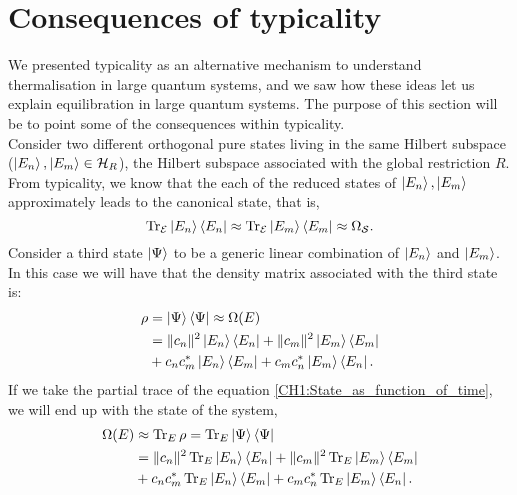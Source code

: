 \section{Consequences of typicality}
We presented typicality as an alternative mechanism to understand thermalisation in large quantum systems, and we saw how these ideas let us explain equilibration in large quantum systems. The purpose of this section will be to point some of the consequences within typicality.\\
\indent Consider two different orthogonal pure states living in the same Hilbert subspace ($\mathinner{|{E_n}\rangle},\mathinner{|{E_m}\rangle} \in \mathcal{H}_{R}$), the Hilbert subspace associated with the global restriction $R$. From typicality, we know that the each of the reduced states of $\mathinner{|{E_n}\rangle},\mathinner{|{E_m}\rangle}$ approximately leads to the canonical state, that is,
\begin{equation}
\operatorname{Tr}_{\mathcal{E}} \mathinner{|{E_n}\rangle}\mathinner{\langle{E_n}|} \approx \operatorname{Tr}_{\mathcal{E}} \mathinner{|{E_m}\rangle}\mathinner{\langle{E_m}|} \approx \Omega_{\mathcal{S}}.
\end{equation}
Consider a third state $\mathinner{|{\Psi}\rangle}$ to be a generic linear combination of $\mathinner{|{E_n}\rangle}$ and $\mathinner{|{E_m}\rangle}$. In this case we will have that the density matrix associated with the third state is:
\begin{equation}
\begin{aligned}
\rho &= \mathinner{|{\Psi}\rangle}\mathinner{\langle{\Psi}|}\approx \Omega(E)\\
&= \|c_n\|^2 \mathinner{|{E_n}\rangle}\mathinner{\langle{E_n}|} +  \|c_m\|^2 \mathinner{|{E_m}\rangle}\mathinner{\langle{E_m}|} \\
& + c_n c^{*}_m  \mathinner{|{E_n}\rangle}\mathinner{\langle{E_m}|}+ c_m c^{*}_n \mathinner{|{E_m}\rangle}\mathinner{\langle{E_n}|}.
\end{aligned}
\label{CH1:State_as_function_of_time}
\end{equation}
If we take the partial trace of the equation \eqref{CH1:State_as_function_of_time}, we will end up with the state of the system,
\begin{equation}
\begin{aligned}
\Omega(E) &\approx \operatorname{Tr}_E \rho = \operatorname{Tr}_E  \mathinner{|{\Psi}\rangle}\mathinner{\langle{\Psi}|}\\
&= \|c_n\|^2\operatorname{Tr}_E  \mathinner{|{E_n}\rangle}\mathinner{\langle{E_n}|} +  \|c_m\|^2 \operatorname{Tr}_E \mathinner{|{E_m}\rangle}\mathinner{\langle{E_m}|} \\
& + c_n c^{*}_m  \operatorname{Tr}_E \mathinner{|{E_n}\rangle}\mathinner{\langle{E_m}|} + c_m c^{*}_n \operatorname{Tr}_E \mathinner{|{E_m}\rangle}\mathinner{\langle{E_n}|}.
\end{aligned}
\label{CH1:State_as_function_of_time_system}
\end{equation}
